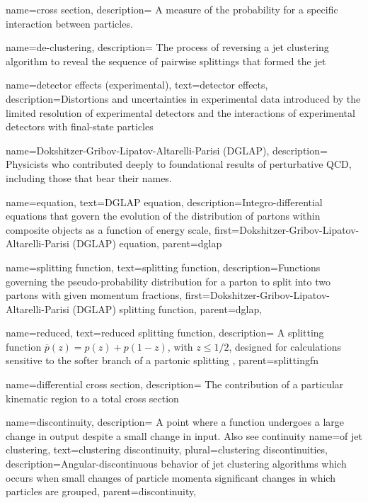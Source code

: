 {
    name=cross section,
    description={
        A measure of the probability for a specific interaction between particles.
    }
}


{
    name=de-clustering,
    description={
        The process of reversing a jet clustering algorithm to reveal the sequence of pairwise splittings that formed the jet
    }
}



{
    name=detector effects (experimental),
    text=detector effects,
    description={Distortions and uncertainties in experimental data introduced by the limited resolution of experimental detectors and the interactions of experimental detectors with final-state particles}
}



{
    name=Dokshitzer-Gribov-Lipatov-Altarelli-Parisi (DGLAP),
    description={
        Physicists who contributed deeply to foundational results of perturbative QCD, including those that bear their names.
    }
}

    {
      name=equation,
      text=DGLAP equation,
      description={Integro-differential equations that govern the evolution of the distribution of partons within composite objects as a function of energy scale},
      first=Dokshitzer-Gribov-Lipatov-Altarelli-Parisi (DGLAP) equation,
      parent=dglap
    }

    {
      name=splitting function,
      text=splitting function,
      description={Functions governing the pseudo-probability distribution for a parton to split into two partons with given momentum fractions},
      first=Dokshitzer-Gribov-Lipatov-Altarelli-Parisi (DGLAP) splitting function,
      parent=dglap,
    }

        {
          name=reduced,
          text=reduced splitting function,
          description={
            A splitting function \(\overline{p}(z) = p(z) + p(1-z)\), with \(z \leq 1/2\), designed for calculations sensitive to the softer branch of a partonic splitting
          },
          parent=splittingfn
        }


{
    name=differential cross section,
    description={
        The contribution of a particular kinematic region to a total cross section
    }
}


{
    name=discontinuity,
    description={
        A point where a function undergoes a large change in output despite a small change in input.
        Also see continuity
    }
}
    {
        name=of jet clustering,
        text={clustering discontinuity},
        plural={clustering discontinuities},
        description={Angular-discontinuous behavior of jet clustering algorithms which occurs when small changes of particle momenta significant changes in which particles are grouped},
        parent=discontinuity,
    }

